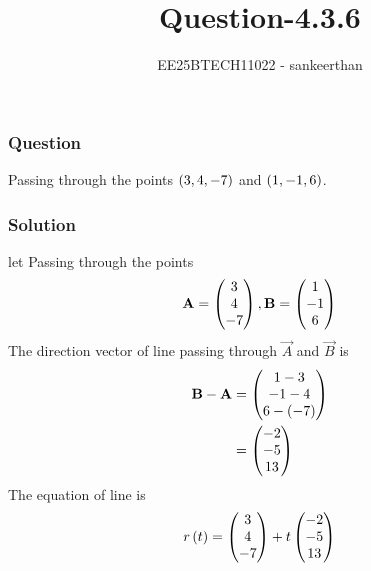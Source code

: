\documentclass{beamer}
\title{Question-4.3.6}
\author{EE25BTECH11022 - sankeerthan}
\date{}
\begin{document}
\frame{\titlepage}

\begin{frame}
\frametitle{Question}
Passing through the points $\left(3,4,-7\right)$ and $\left(1,-1,6\right)$.
\end{frame}

\begin{frame}
\frametitle{Solution}
let Passing through the points
\begin{align}
\mathbf{A} =\begin{pmatrix}3 \\4 \\ -7\end{pmatrix} ,\mathbf{B} =\begin{pmatrix}1 \\ -1 \\ 6\end{pmatrix} 
\end{align}
The direction vector of line passing through $\vec{A}$ and $\vec{B}$ is
\begin{align}
\mathbf{B} -\mathbf{A} &=\begin{pmatrix}1-3 \\ -1-4 \\  6-(-7)\end{pmatrix} \\
    &= \begin{pmatrix}-2 \\ -5 \\ 13\end{pmatrix}
\end{align}
The equation of line is 
\begin{align}
    r\left(t\right) = \begin{pmatrix}3 \\4 \\ -7\end{pmatrix} + t\begin{pmatrix}-2 \\ -5 \\ 13\end{pmatrix}
\end{align}
\end{frame}
\end{document}
